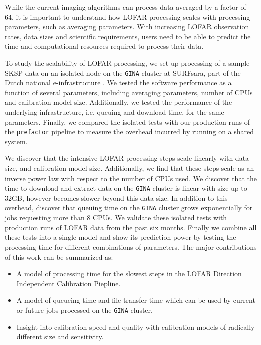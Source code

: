 \documentclass[preprint,5p]{elsarticle}
\begin{document}
While the current imaging algorithms can process data averaged by a factor of 64, it is important to understand how LOFAR processing scales with processing parameters, such as averaging parameters. With increasing LOFAR observation rates, data sizes and scientific requirements, users need to be able to predict the time and computational resources required to process their data.  

To study the scalability of LOFAR processing, we set up processing of a sample SKSP data on an isolated node on the \texttt{GINA} cluster at SURFsara, part of the Dutch national e-infrastructure \citep{dutch_einfra}. We tested the software performance as a function of several parameters, including averaging parameters, number of CPUs and calibration model size. Additionally, we tested the performance of the underlying infrastructure, i.e. queuing  and download time, for the same parameters. Finally, we compared the isolated tests with our production runs of the \texttt{prefactor} pipeline to measure the overhead incurred by running on a shared system. 

We discover that the intensive LOFAR processing steps scale linearly with data size, and calibration model size. Additionally, we find that these steps scale as an inverse power law with respect to the number of CPUs used. We discover that the time to download and extract data on the \texttt{GINA} cluster is linear with size up to 32GB, however becomes slower beyond this data size. In addition to this overhead, discover that queuing time on the \texttt{GINA} cluster grows exponentially for jobs requesting more than 8 CPUs. We validate these isolated tests with production runs of LOFAR data from the past six months.  Finally we combine all these tests into a single model and show its prediction power by testing the processing time for different combinations of parameters. The major contributions of this work can be summarized as:

\begin{itemize}
    \item A model of processing time for the slowest steps in the LOFAR Direction Independent Calibration Piepline.
    \item A model of queueing time and file transfer time which can be used by current or future jobs processed on the \texttt{GINA} cluster.
    \item Insight into calibration speed and quality with calibration models of radically different size and sensitivity.
\end{itemize}
\end{document}
